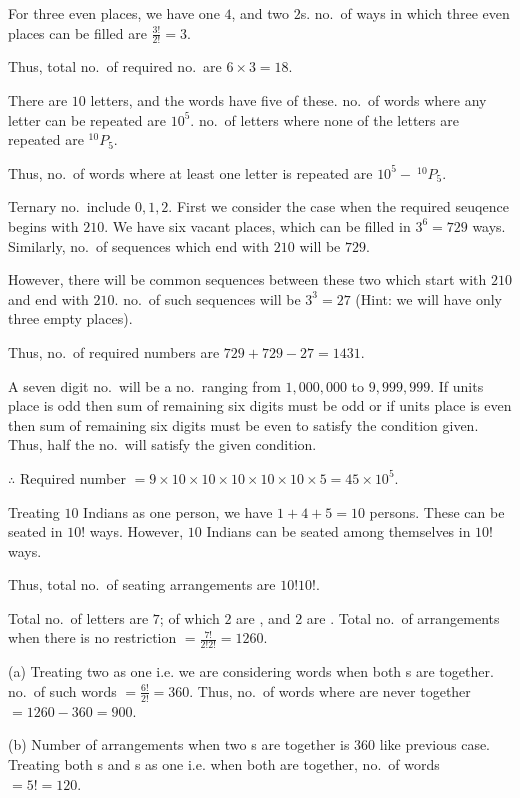   For three even places, we have one $4$, and two $2$\symbol[rightquote]s. no.\ of ways in which three even places can be
  filled are $\frac{3!}{2!} = 3$.

  Thus, total no.\ of required no.\ are $6\times3 = 18$.
\item There are $10$ letters, and the words have five of these. no.\ of words where any letter can be
  repeated are $10^5$. no.\ of letters where none of the letters are repeated are $^{10}P_5$.

  Thus, no.\ of words where at least one letter is repeated are $10^5 - \ ^{10}P_5$.
\item Ternary no.\ include $0, 1, 2$. First we consider the case when the required seuqence begins with
  $210$. We have six vacant places, which can be filled in $3^6 = 729$ ways. Similarly, no.\ of sequences
  which end with $210$ will be $729$.

  However, there will be common sequences between these two which start with $210$ and end with
  $210$. no.\ of such sequences will be $3^3 = 27$ (Hint: we will have only three empty places).

  Thus, no.\ of required numbers are $729 + 729 - 27 = 1431$.
\item A seven digit no.\ will be a no.\ ranging from $1,000,000$ to $9,999,999$. If units place is odd then
  sum of remaining six digits must be odd or if units place is even then sum of remaining six digits
  must be even to satisfy the condition given. Thus, half the no.\ will satisfy the given condition.

  $\therefore $ Required number $= 9\times10\times10\times10\times10\times10\times5 = 45\times10^5$.
\item Treating $10$ Indians as one person, we have $1 + 4 + 5 = 10$ persons. These can be seated in $10!$
  ways. However, $10$ Indians can be seated among themselves in $10!$ ways.

  Thus, total no.\ of seating arrangements are $10!10!$.
\item Total no.\ of letters are $7$; of which $2$ are , and $2$ are . Total no.\ of
  arrangements when there is no restriction $=\frac{7!}{2!2!} = 1260$.

  (a) Treating two  as one i.e. we are considering words when both s are together. no.\ of
  such words $=\frac{6!}{2!} = 360$. Thus, no.\ of words where  are never together $= 1260 - 360 =
  900$.

  (b) Number of arrangements when two s are together is $360$ like previous case. Treating both
  s and \symbol[rightquote]s as one i.e. when both are together, no.\ of words $=5! = 120$.

